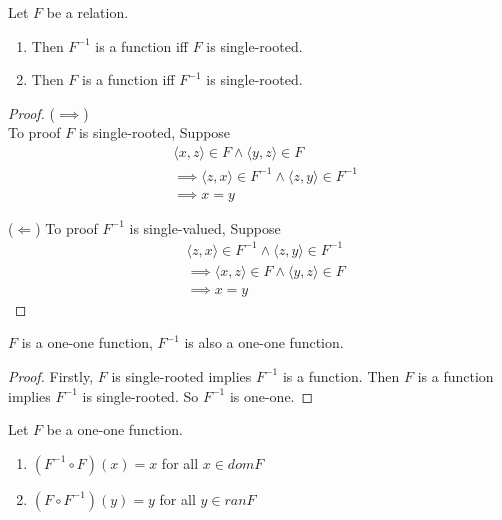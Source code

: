 \begin{theorem}{}{}
    Let $F$ be a relation.
    \begin{enumerate}

        \item Then $F^{-1}$ is a function iff $F$ is single-rooted.
        \item Then $F$ is a function iff $F^{-1}$ is single-rooted.

    \end{enumerate}
\end{theorem}

\begin{proof}
    ($\implies $)\\
    To proof $F$ is single-rooted, Suppose
    \begin{align*}
        &\langle x,z \rangle \in F \land \langle y,z \rangle \in F\\
        &\implies \langle z,x \rangle \in F^{-1} \land \langle z,y
        \rangle \in F^{-1} \\
        &\implies x = y
    \end{align*}

    ($\Leftarrow $)
    To proof $F^{-1}$ is single-valued, Suppose
    \begin{align*}
        &\langle z,x\rangle \in F^{-1} \land \langle z,y \rangle \in F^{-1}\\
        &\implies \langle x,z \rangle \in F \land \langle y,z \rangle \in F\\
        &\implies x = y
    \end{align*}
\end{proof}

\begin{corollary}{}{}
    $F$ is a one-one function, $F^{-1}$ is also a one-one function.
\end{corollary}

\begin{proof}
    Firstly, $F$ is single-rooted implies $F^{-1}$ is a function. Then
    $F$ is a function implies $F^{-1}$ is single-rooted. So $F^{-1}$ is one-one.
\end{proof}

\begin{theorem}{}{}
    Let $F$ be a one-one function.
    \begin{enumerate}
        \item $(F^{-1} \circ F)(x) = x$ for all $x \in domF$
        \item $(F \circ F^{-1})(y) = y$ for all $y \in ranF$
    \end{enumerate}
\end{theorem}

